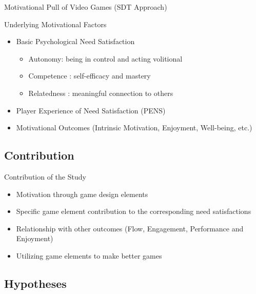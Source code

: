 \documentclass{beamer}
\begin{document}
\begin{frame}{Motivational Pull of Video Games (SDT Approach)}
	\begin{block}{Underlying Motivational Factors}
    \begin{itemize}
    \item Basic Psychological Need Satisfaction
    	\begin{itemize}
    		\item \alert{Autonomy}: \textcolor{green!50!black}{being in control and acting volitional}
  			\item \alert{Competence} : \textcolor{green!50!black}{self-efficacy and mastery}
  			\item \alert{Relatedness} : \textcolor{green!50!black}{meaningful connection to others}
  		\end{itemize}
  	 \item Player Experience of Need Satisfaction (PENS) \cite{PrzybylskiRigbyRyan2006MotivationPullofGames}
    \item Motivational Outcomes (Intrinsic Motivation, Enjoyment, Well-being, etc.)
    \end{itemize}
    \end{block}
\end{frame}

\subsection{Contribution}

\begin{frame}{Contribution of the Study}
    \begin{itemize}
    \item Motivation through game design elements
    \item Specific game element contribution to the corresponding need satisfactions
    \item Relationship with other outcomes (Flow, Engagement, Performance and Enjoyment)
     \item Utilizing game elements to make better games
    \end{itemize}
\end{frame}



\subsection{Hypotheses}
\end{document}
